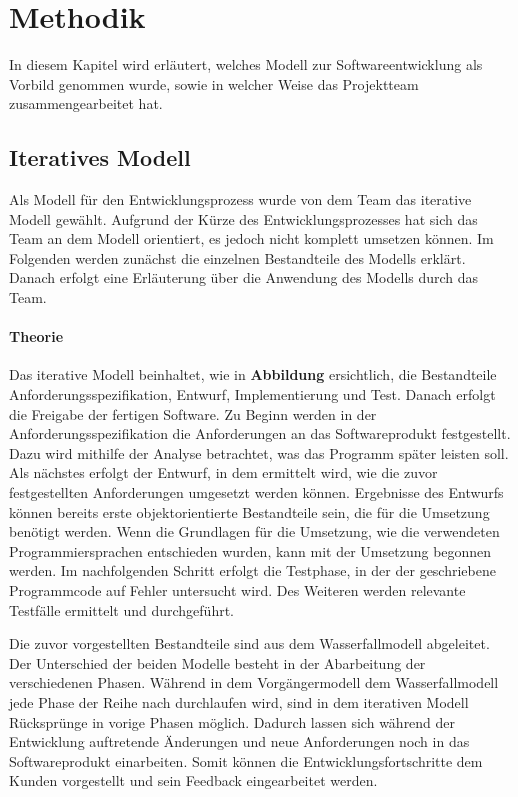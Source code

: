 \chapter{Methodik}

In diesem Kapitel wird erläutert, welches Modell zur Softwareentwicklung als Vorbild genommen wurde, sowie in welcher Weise das Projektteam zusammengearbeitet hat. 

\section{Iteratives Modell}
Als Modell für den Entwicklungsprozess wurde von dem Team das iterative Modell gewählt. Aufgrund der Kürze des Entwicklungsprozesses hat sich das Team an dem Modell orientiert, es jedoch nicht komplett umsetzen können. Im Folgenden werden zunächst die einzelnen Bestandteile des Modells erklärt. Danach erfolgt eine Erläuterung über die Anwendung des Modells durch das Team.

\subsubsection{Theorie}
Das iterative Modell beinhaltet, wie in \textbf{Abbildung} ersichtlich,  die Bestandteile Anforderungsspezifikation, Entwurf, Implementierung und Test. Danach erfolgt die Freigabe der fertigen Software. 
Zu Beginn werden in der Anforderungsspezifikation die Anforderungen an das Softwareprodukt festgestellt. Dazu wird mithilfe der Analyse betrachtet, was das Programm später leisten soll. Als nächstes erfolgt der Entwurf, in dem ermittelt wird, wie die zuvor festgestellten Anforderungen umgesetzt werden können. Ergebnisse des Entwurfs können bereits erste objektorientierte Bestandteile sein, die für die Umsetzung benötigt werden. Wenn die Grundlagen für die Umsetzung, wie die verwendeten Programmiersprachen entschieden wurden, kann mit der Umsetzung begonnen werden. Im nachfolgenden Schritt erfolgt die Testphase, in der der geschriebene Programmcode auf Fehler untersucht wird. Des Weiteren werden relevante Testfälle ermittelt und durchgeführt. 

Die zuvor vorgestellten Bestandteile sind aus dem Wasserfallmodell abgeleitet. Der Unterschied der beiden Modelle besteht in der Abarbeitung der verschiedenen Phasen. Während in dem Vorgängermodell dem Wasserfallmodell jede Phase der Reihe nach durchlaufen wird, sind in dem iterativen Modell Rücksprünge in vorige Phasen möglich. Dadurch lassen sich während der Entwicklung auftretende Änderungen und neue Anforderungen noch in das Softwareprodukt einarbeiten. Somit können die Entwicklungsfortschritte dem Kunden vorgestellt und sein Feedback eingearbeitet werden. 

